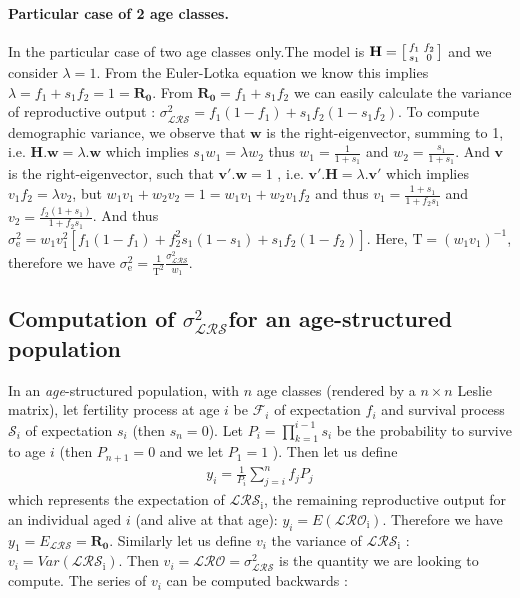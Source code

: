 \documentclass[10pt,a4paper]{article}
\newcommand{\vLRO}{$\sigma_{\mathrm{\mathcal{LRS}}}^2$}
\begin{document}
\paragraph*{Particular case of 2 age classes.}In the particular case of two age classes only.The model is $\mathbf{H}=\begin{bsmallmatrix} f_1 & f_2 \\ s_1 & 0 \end{bsmallmatrix}$ and we consider $\lambda=1$. From the Euler-Lotka equation  \citep{Euler1760,Lotka1939} we know this implies $\lambda=f_{1} +s_{1}f_{2}=1= \mathbf{R_{0}}$.
From $\mathbf{R_{0}}=f_{1}+s_{1}f_{2}$ we can easily calculate the variance of reproductive output : $\sigma^{2}_{\mathcal{LRS}}=f_{1}(1-f_{1})+s_{1}f_{2}(1-s_{1}f_{2}) $. To compute demographic variance, we observe that $\bm{w}$ is the right-eigenvector, summing to 1, i.e. $\mathbf{H}.\bm{w}=\lambda.\bm{w} $ which implies $s_{1}w_{1}=\lambda w_{2}$ thus $w_{1}=\frac{1}{1 + s_{1}}$ and $w_{2}=\frac{s_{1}}{1+ s_{1}}$. And $\bm{v}$ is the right-eigenvector, such that $\bm{v}'.\bm{w}=1$ , i.e. $\bm{v}'.\mathbf{H}=\lambda.\bm{v}' $ which implies $v_{1}f_{2}=\lambda v_{2}$, but $w_{1}v_{1}+w_{2}v_{2}=1= w_{1}v_{1}+w_{2} {v_{1}f_{2}}$ and thus $v_{1}=\frac{1+ s_{1}}{1+f_{2}s_{1}}$ and $v_{2}=\frac{f_{2}(1 + s_{1})}{1+f_{2}s_{1}}$. And thus $\sigma^{2}_{\mathrm{e}}=w_{1}v_{1}^{2}[f_{1}(1-f_{1})+f_{2}^{2}s_{1}(1-s_{1})+s_{1}f_{2}(1-f_{2})]$. Here, $\mathrm{T}=(w_{1}v_{1})^{-1}$, therefore we have $\sigma^{2}_{\mathrm{e}}=\frac{1}{\mathrm{T}^{2}}\frac{\sigma^{2}_{\mathcal{LRS}}}{w_{1}}$.\\



\subsection{Computation of \texorpdfstring{\vLRO} \\ for an age-structured population}
\label{sec:comvLROage}

In an \emph{age}-structured population, with $n$ age classes (rendered by a $n \times n$ Leslie matrix), let fertility process at age $i$ be $\mathcal{F}_{i}$ of expectation $f_{i}$ and survival process $\mathcal{S}_{i}$ of expectation $s_i$ (then $s_{n}=0$). Let $P_{i}=\prod_{k=1}^{i-1} s_{i}$ be the probability to survive to age $i$ (then $P_{n+1}=0$ and we let $P_{1}=1$ ). Then let us define 
\begin{eqnarray}
y_i= \frac{1}{P_{i}} \sum_{j=i}^{n} f_{j}P_{j}
\label{eq:bbb}
\end{eqnarray}
which represents the expectation of $\mathcal{LRS_{\mathrm{i}}}$, the remaining reproductive output for an individual aged $i$ (and alive at that age): $y_i=E({\mathcal{LRO_{\mathrm{i}}}})$. Therefore we have $y_1=E_{\mathcal{LRS}}=\mathbf{R_0}.$
Similarly let us define $v_i$ the variance of $\mathcal{LRS_{\mathrm{i}}}$ : $v_i=Var({\mathcal{LRS_{\mathrm{i}}}})$. Then $v_i=\mathcal{LRO}=\sigma_{\mathcal{LRS}}^{2}$ is the quantity we are looking to compute. The series of $v_i$ can be computed backwards :
\end{document}
